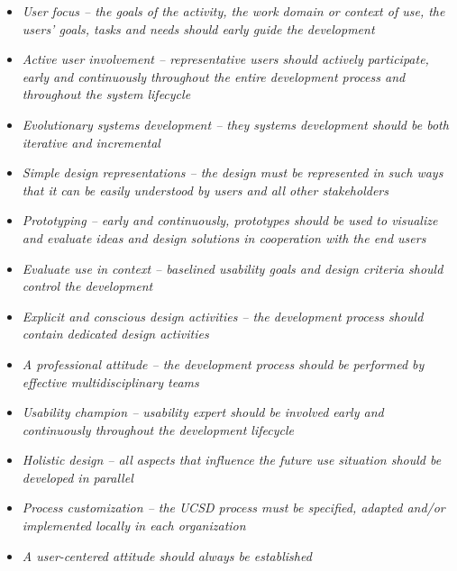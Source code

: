 \begin{itemize}
  \item{%
      \textit{%
        User focus -- the goals of the activity, the work domain or
        context of use, the users' goals, tasks and  needs should early guide
        the development%
      }%
%
  }
  \item{%
      \textit{%
        Active user involvement -- representative users should actively
        participate, early and continuously throughout the entire development
        process and throughout the system lifecycle%
      }%
  }
  \item{%
      \textit{%
        Evolutionary systems development -- they systems development should be
        both iterative and incremental%
      }%
  }
  \item{%
      \textit{%
        Simple design representations -- the design must be represented in
        such ways that it can be easily understood by users and all other
        stakeholders%
      }%
  }
  \item{%
      \textit{%
        Prototyping -- early and continuously, prototypes should be used to
        visualize and evaluate ideas and design solutions in cooperation with
        the end users%
      }%
  }
  \item{%
      \textit{%
        Evaluate use in context -- baselined usability goals and design
        criteria should control the development%
      }%
  }
  \item{%
      \textit{%
        Explicit and conscious design activities -- the development process
        should contain dedicated design activities%
      }%
  }
  \item{%
      \textit{%
        A professional attitude -- the development process should be performed
        by effective multidisciplinary teams%
      }%
  }
  \item{%
      \textit{%
        Usability champion -- usability expert should be involved early and
        continuously throughout the development lifecycle%
      }%
  }
  \item{%
      \textit{%
        Holistic design -- all aspects that influence the future use situation
        should be developed in parallel%
      }%
  }
  \item{%
      \textit{%
        Process customization -- the UCSD process must be specified, adapted
        and/or implemented locally in each organization%
      }%
  }
  \item{%
      \textit{%
        A user-centered attitude should always be established%
      }%
  }
\end{itemize}

